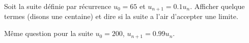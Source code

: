 
\begin{exercice}\label{exoPremiere-0057}

    Soit la suite définie par récurrence \( u_0=65\) et \( u_{n+1}=0.1u_n\). Afficher quelque termes (disons une centaine) et dire si la suite a l'air d'accepter une limite.

    Même question pour la suite \( u_0=200\), \( u_{n+1}=0.99u_n\).

\end{exercice}
